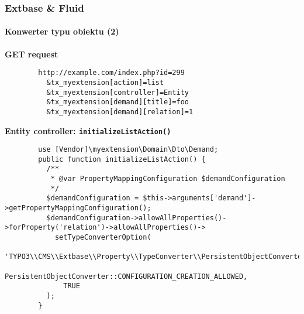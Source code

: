 
\begin{frame}[fragile]
	\frametitle{Extbase \& Fluid}
	\framesubtitle{Konwerter typu obiektu (2)}

	\lstset{
		basicstyle=\tiny\ttfamily
	}

	\smaller\textbf{GET request}\normalsize
	\begin{lstlisting}
		http://example.com/index.php?id=299
		  &tx_myextension[action]=list
		  &tx_myextension[controller]=Entity
		  &tx_myextension[demand][title]=foo
		  &tx_myextension[demand][relation]=1
	\end{lstlisting}

	\smaller\textbf{Entity controller: \texttt{initializeListAction()}}\normalsize
	\begin{lstlisting}
		use [Vendor]\myextension\Domain\Dto\Demand;
		public function initializeListAction() {
		  /**
		   * @var PropertyMappingConfiguration $demandConfiguration
		   */
		  $demandConfiguration = $this->arguments['demand']->getPropertyMappingConfiguration();
		  $demandConfiguration->allowAllProperties()->forProperty('relation')->allowAllProperties()->
		    setTypeConverterOption(
		      'TYPO3\\CMS\\Extbase\\Property\\TypeConverter\\PersistentObjectConverter',
		      PersistentObjectConverter::CONFIGURATION_CREATION_ALLOWED,
		      TRUE
		  );
		}
	\end{lstlisting}

\end{frame}


